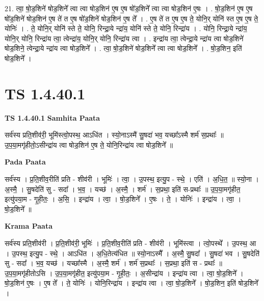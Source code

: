 \documentclass[17pt]{extarticle}
\begin{document}
21. त्वा॒ षो॒ड॒शिने॑ षोड॒शिने᳚ त्वा त्वा षोड॒शिन॑ ए॒ष ए॒ष षो॑ड॒शिने᳚ त्वा त्वा षोड॒शिन॑ ए॒षः । . षो॒ड॒शिन॑ ए॒ष ए॒ष षो॑ड॒शिने॑ षोड॒शिन॑ ए॒ष ते॑ त ए॒ष षो॑ड॒शिने॑ षोड॒शिन॑ ए॒ष ते᳚ । . ए॒ष ते॑ त ए॒ष ए॒ष ते॒ योनि॒र् योनि॑ स्त ए॒ष ए॒ष ते॒ योनिः॑ । . ते॒ योनि॒र् योनि॑ स्ते ते॒ योनि॒ रिन्द्रा॒ये न्द्रा॑य॒ योनि॑ स्ते ते॒ योनि॒ रिन्द्रा॑य । . योनि॒ रिन्द्रा॒ये न्द्रा॑य॒ योनि॒र् योनि॒ रिन्द्रा॑य त्वा॒ त्वेन्द्रा॑य॒ योनि॒र् योनि॒ रिन्द्रा॑य त्वा । . इन्द्रा॑य त्वा॒ त्वेन्द्रा॒ये न्द्रा॑य त्वा षोड॒शिने॑ षोड॒शिने॒ त्वेन्द्रा॒ये न्द्रा॑य त्वा षोड॒शिने᳚ । . त्वा॒ षो॒ड॒शिने॑ षोड॒शिने᳚ त्वा त्वा षोड॒शिने᳚ । . षो॒ड॒शिन॒ इति॑ षोड॒शिने᳚ । \newline
\pagebreak
{}

\section{ TS 1.4.40.1 }

\textbf{TS 1.4.40.1 } \newline
\textbf{Samhita Paata} \newline

सर्व॑स्य प्रति॒शीव॑री॒ भूमि॑स्त्वो॒पस्थ॒ आऽधि॑त । स्यो॒नाऽस्मै॑ सु॒षदा॑ भव॒ यच्छा᳚ऽस्मै शर्म॑ स॒प्रथाः᳚ ॥ उ॒प॒या॒मगृ॑हीतो॒ऽसीन्द्रा॑य त्वा षोड॒शिन॑ ए॒ष ते॒ योनि॒रिन्द्रा॑य त्वा षोड॒शिने᳚ ॥ \newline

\textbf{Pada Paata} \newline

सर्व॑स्य । प्र॒ति॒शीव॒रीति॑ प्रति - शीव॑री । भूमिः॑ । त्वा॒ । उ॒पस्थ॒ इत्यु॒प - स्थे॒ । एति॑ । अ॒धि॒त॒ ॥ स्यो॒ना । अ॒स्मै॒ । सु॒षदेति॑ सु - सदा᳚ । भ॒व॒ । यच्छ॑ । अ॒स्मै॒ । शर्म॑ । स॒प्रथा॒ इति॑ स-प्रथाः᳚ ॥ उ॒प॒या॒मगृ॑हीत॒ इत्यु॑पया॒म - गृ॒ही॒तः॒ । अ॒सि॒ । इन्द्रा॑य । त्वा॒ । षो॒ड॒शिने᳚ । ए॒षः । ते॒ । योनिः॑ । इन्द्रा॑य । त्वा॒ । षो॒ड॒शिने᳚ ॥  \newline


\textbf{Krama Paata} \newline

सर्व॑स्य प्रति॒शीव॑री । प्र॒ति॒शीव॑री॒ भूमिः॑ । प्र॒ति॒शीव॒रीति॑ प्रति - शीव॑री । भूमि॑स्त्वा । त्वो॒पस्थे᳚ । उ॒पस्थ॒ आ । उ॒पस्थ॒ इत्यु॒प - स्थे॒ । आऽधि॑त । अ॒धि॒तेत्य॑धित ॥ स्यो॒नाऽस्मै᳚ । अ॒स्मै॒ सु॒षदा᳚ । सु॒षदा॑ भव । सु॒षदेति॑ सु - सदा᳚ । भ॒व॒ यच्छ॑ । यच्छा᳚स्मै । अ॒स्मै॒ शर्म॑ । शर्म॑ स॒प्रथाः᳚ । स॒प्रथा॒ इति॑ स - प्रथाः᳚ ॥ उ॒प॒या॒मगृ॑हीतोऽसि । उ॒प॒या॒मगृ॑हीत॒ इत्यु॑पया॒म - गृ॒ही॒तः॒ । अ॒सीन्द्रा॑य । इन्द्रा॑य त्वा । त्वा॒ षो॒ड॒शिने᳚ । षो॒ड॒शिन॑ ए॒षः । ए॒ष ते᳚ । ते॒ योनिः॑ । योनि॒रिन्द्रा॑य । इन्द्रा॑य त्वा । त्वा॒ षो॒ड॒शिने᳚ । षो॒ड॒शिन॒ इति॑ षोड॒शिने᳚ । \newline
\end{document}
